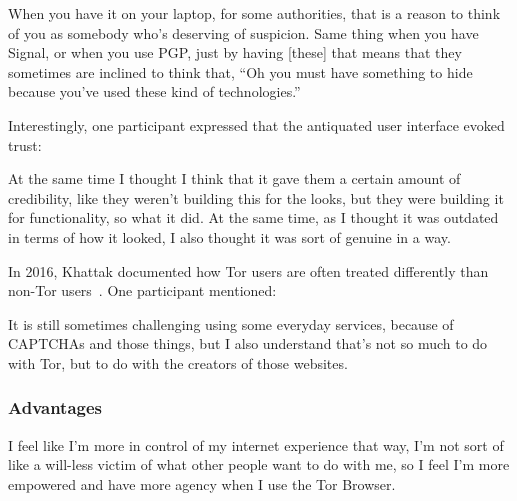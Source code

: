 \begin{displayquote}
When you have it on your laptop, for some authorities, that is a reason to think
of you as somebody who's deserving of suspicion.  Same thing when you have
Signal, or when you use PGP, just by having [these] that means that they
sometimes are inclined to think that, ``Oh you must have something to hide
because you've used these kind of technologies.''
\end{displayquote}

Interestingly, one participant expressed that the antiquated user interface
evoked trust:

\begin{displayquote}
At the same time I thought I think that it gave them a certain amount of
credibility, like they weren't building this for the looks, but they were
building it for functionality, so what it did.  At the same time, as I thought
it was outdated in terms of how it looked, I also thought it was sort of genuine
in a way.
\end{displayquote}

In 2016, Khattak \ea documented how Tor users are often treated differently than
non-Tor users~\cite{Khattak2016a}.  One participant mentioned:

\begin{displayquote}
It is still sometimes challenging using some everyday services, because of
CAPTCHAs and those things, but I also understand that's not so much to do with
Tor, but to do with the creators of those websites.
\end{displayquote}

\subsubsection{Advantages}

\begin{displayquote}
I feel like I'm more in control of my internet experience that way, I'm not sort
of like a will-less victim of what other people want to do with me, so I feel
I'm more empowered and have more agency when I use the Tor Browser.
\end{displayquote}
